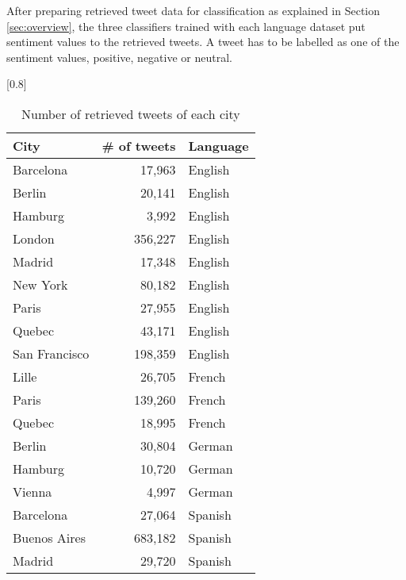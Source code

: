 \documentclass[twocolumn]{article}
\begin{document}
After preparing retrieved tweet data for classification as explained in Section \ref{sec:overview}, the three classifiers trained with each language dataset put sentiment values to the retrieved tweets.
A tweet has to be labelled as one of the sentiment values, positive, negative or neutral.

\begin{table}[ht]
	\caption{Number of retrieved tweets of each city}
	\scalebox{0.9}[0.8]{
	\begin{tabular}{|l|r|l|} \hline
	City&\# of tweets&Language\\ \hline \hline
	Barcelona & 17,963 & English \\ \hline
	Berlin & 20,141 & English\\ \hline
	Hamburg & 3,992 & English\\ \hline
	London  & 356,227& English\\ \hline
	Madrid & 17,348 & English \\ \hline
	New York  & 80,182  & English\\ \hline
	Paris & 27,955 & English \\ \hline
	Quebec & 43,171 & English \\ \hline
	San Francisco & 198,359  & English\\ \hline
	Lille & 26,705  & French\\ \hline
	Paris & 139,260 & French\\ \hline
	Quebec & 18,995 & French\\ \hline
	Berlin & 30,804 & German\\ \hline
	Hamburg & 10,720 & German\\ \hline
	Vienna & 4,997  & German\\ \hline
	Barcelona&27,064 & Spanish\\ \hline
	Buenos Aires&683,182  & Spanish\\ \hline
	Madrid& 29,720 & Spanish\\ \hline
	\end{tabular}
	}
	\label{tab:cities}
\end{table}

\vspace{-6mm}
\end{document}
